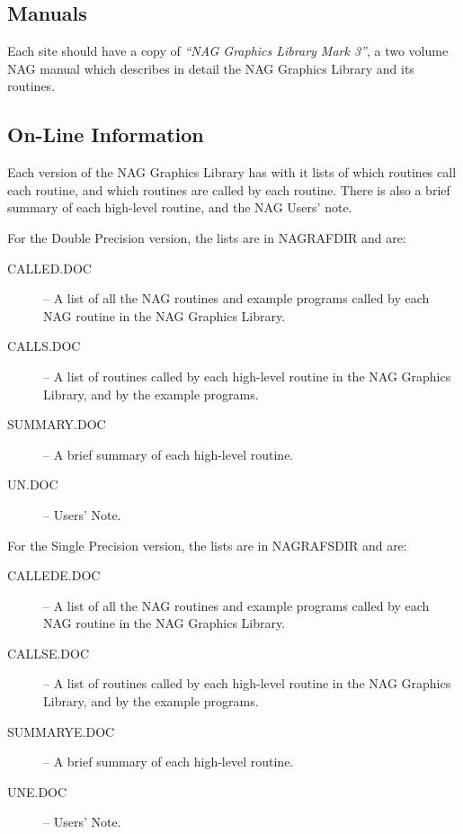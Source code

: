 \subsection{Manuals}

Each site should have a copy of {\em ``NAG Graphics Library Mark 3''\/}, a two
volume NAG manual which describes in detail the NAG Graphics Library and its
routines.

\subsection{On-Line Information}

Each version of the NAG Graphics Library has with it lists of which routines
call each routine, and which routines are called by each routine. There is also
a brief summary of each high-level routine, and the NAG Users' note.

For the Double Precision version, the lists are in NAGRAFDIR and are:
\begin{description}
\begin{description}
\item[CALLED.DOC] -- A list of all the NAG routines and example programs called
by each NAG routine in the NAG Graphics Library.
\item[CALLS.DOC] -- A list of routines called by each high-level routine in the
NAG Graphics Library, and by the example programs.
\item[SUMMARY.DOC] -- A brief summary of each high-level routine.
\item[UN.DOC] -- Users' Note.
\end{description}
\end{description}

For the Single Precision version, the lists are in NAGRAFSDIR and are:
\begin{description}
\begin{description}
\item[CALLEDE.DOC] -- A list of all the NAG routines and example programs called
by each NAG routine in the NAG Graphics Library.
\item[CALLSE.DOC] -- A list of routines called by each high-level routine in the
NAG Graphics Library, and by the example programs.
\item[SUMMARYE.DOC] -- A brief summary of each high-level routine.
\item[UNE.DOC] -- Users' Note.
\end{description}
\end{description}

